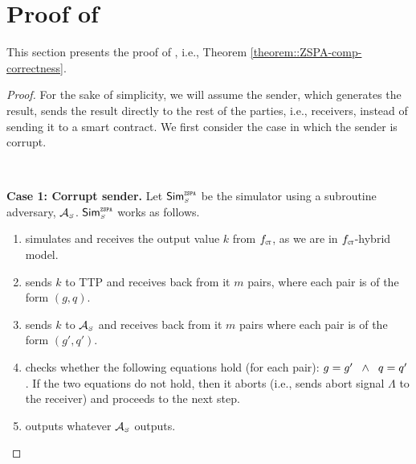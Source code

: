 

\section{Proof of \zspa}\label{sec::Proof-of-zspa}

This section presents the proof of \zspa, i.e., Theorem \ref{theorem::ZSPA-comp-correctness}. 
\begin{proof}
For the sake of simplicity, we will assume the sender, which generates the result, sends the result directly to the rest of the parties, i.e., receivers, instead of sending it to a smart contract. We first consider the case in which the sender is corrupt. 

\

\noindent\textbf{Case 1: Corrupt sender.}  Let $\mathsf{Sim}^{\scriptscriptstyle \mathtt{ZSPA}}_{\scriptscriptstyle S}$ be the simulator using a subroutine adversary, $\mathcal{A}_{\scriptscriptstyle S}$. $\mathsf{Sim}^{\scriptscriptstyle \mathtt{ZSPA}}_{\scriptscriptstyle S}$ works as follows. 
%
\begin{enumerate}
%
\item simulates  \ct  and receives the output value $k$ from $f_{\scriptscriptstyle \mathtt{CT}}$, as we are in $f_{\scriptscriptstyle \mathtt{CT}}$-hybrid model.
%
\item sends $k$ to TTP and receives back from it $m$ pairs, where each pair is of the form $( g,  q)$. 
%
\item sends $ k$ to $\mathcal{A}_{\scriptscriptstyle S}$ and receives back from it $m$ pairs  where each pair is of the form $( g',  q')$. 
%
\item checks whether the following equations hold (for each pair): $ g= g' \hspace{2mm} \wedge  \hspace{2mm}  q= q'$. If the two equations do not hold, then it aborts (i.e., sends abort signal $\Lambda$ to the receiver) and proceeds to the next step.
%
\item outputs whatever $\mathcal{A}_{\scriptscriptstyle S}$ outputs.
%
 \end{enumerate}
 

\end{proof}
